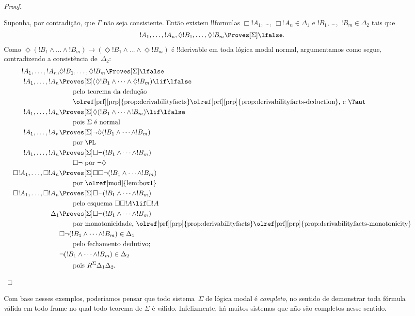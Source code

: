 \documentclass[../../../include/open-logic-section]{subfiles}
\begin{document}
\begin{proof}
\begin{enumerate}
    Suponha, por contradição, que $\Gamma$ não seja consistente. Então
    existem !!{formula}s $\Box!A_1$, \dots, $\Box!A_n \in \Delta_1$ e
    $!B_1$, \dots,~$!B_m \in \Delta_2$ tais que \[!A_1, \dots,
    !A_n, \Diamond!B_1, \dots, \Diamond!B_m \Proves[\Sigma]
    \lfalse.\] Como $\Diamond (!B_1 \land \dots \land !B_m) \to
    (\Diamond!B_1 \land \dots \land \Diamond!B_m)$ é !!{derivable} em
    toda lógica modal normal, argumentamos como segue, contradizendo a
    consistência de~$\Delta_2$:
    \begin{align*}
      !A_1, \dots, !A_n, & \Diamond!B_1, \dots,
      \Diamond!B_m \Proves[\Sigma] \lfalse \\
      !A_1, \dots,!A_n & \Proves[\Sigma] (\Diamond!B_1 \land
      \dots \land \Diamond!B_m) \lif \lfalse\\
      & \qquad\text{pelo teorema da dedução}\\
      & \qquad\text{\olref[prf][prp]{prop:derivabilityfacts}\olref[prf][prp]{prop:derivabilityfacts-deduction}, e \Taut} \\
      !A_1, \dots,!A_n & \Proves[\Sigma]
      \Diamond(!B_1 \land
      \dots \land !B_m) \lif \lfalse\\
      & \qquad \text{pois $\Sigma$ é normal} \\
      !A_1, \dots,!A_n & \Proves[\Sigma]
      \lnot\Diamond (!B_1 \land \dots \land !B_m)\\
      & \qquad\text{por \PL} \\
      !A_1, \dots,!A_n & \Proves[\Sigma]
      \Box\lnot (!B_1 \land \dots \land !B_m)\\
      & \qquad\text{$\Box\lnot$ por $\lnot\Diamond$} \\
      \Box!A_1, \dots,\Box!A_n
      & \Proves[\Sigma] \Box\Box \lnot (!B_1 \land \dots \land !B_m)\\
      & \qquad\text{por \olref[mod]{lem:box1}} \\
      \Box!A_1, \dots,\Box!A_n
      & \Proves[\Sigma]
      \Box\lnot (!B_1 \land \dots \land !B_m)\\
      &\qquad\text{pelo esquema $\Box\Box!A \lif \Box!A$} \\
      \Delta_1 & \Proves[\Sigma]
      \Box\lnot (!B_1 \land \dots \land !B_m)\\
      &\qquad\text{por monotonicidade, \olref[prf][prp]{prop:derivabilityfacts}\olref[prf][prp]{prop:derivabilityfacts-monotonicity}} \\
      & \Box\lnot (!B_1 \land \dots \land !B_m) \in \Delta_1\\
      &\qquad\text{pelo fechamento dedutivo}; \\
      & \lnot (!B_1 \land \dots \land !B_m) \in \Delta_2\\
      &\qquad \text{pois }
      R^\Sigma \Delta_1\Delta_2. 
    \end{align*}
  \end{enumerate}
\end{proof}

Com base nesses exemplos, poderíamos pensar que todo sistema~$\Sigma$
de lógica modal é \emph{completo}, no sentido de demonstrar toda
fórmula válida em todo frame no qual todo teorema de $\Sigma$ é
válido. Infelizmente, há muitos sistemas que não são completos nesse
sentido.
\end{document}
